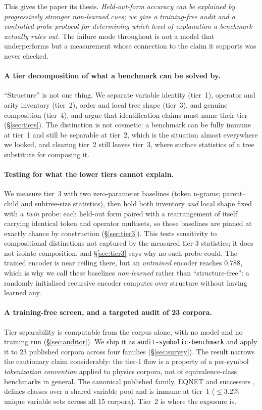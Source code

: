 This gives the paper its thesis. \emph{Held-out-form accuracy can be explained by progressively
stronger non-learned cues; we give a training-free audit and a controlled-probe protocol for
determining which level of explanation a benchmark actually rules out.} The failure mode throughout
is not a model that underperforms but a measurement whose connection to the claim it supports was
never checked.

\paragraph{A tier decomposition of what a benchmark can be solved by.} ``Structure'' is not one
thing. We separate variable identity (tier~1), operator and arity inventory (tier~2), order and
local tree shape (tier~3), and genuine composition (tier~4), and argue that identification claims
must name their tier (\S\ref{sec:tiers}). The distinction is not cosmetic: a benchmark can be fully
immune at tier~1 and still be separable at tier~2, which is the situation almost everywhere we
looked, and clearing tier~2 still leaves tier~3, where surface statistics of a tree substitute
for composing it.

\paragraph{Testing for what the lower tiers cannot explain.} We measure tier~3 with two
zero-parameter baselines (token n-grams; parent--child and subtree-size statistics), then hold both
inventory \emph{and} local shape fixed with a \emph{twin} probe: each held-out form paired with a
rearrangement of itself carrying identical token and operator multisets, so those baselines are
pinned at exactly chance by construction (\S\ref{sec:tier3}). This tests sensitivity to
compositional distinctions not captured by the measured tier-3 statistics; it does not isolate
composition, and \S\ref{sec:tier3} says why no such probe could. The trained encoder is near
ceiling there, but an \emph{untrained} encoder reaches $0.788$, which is why we call these
baselines \emph{non-learned} rather than ``structure-free'': a randomly initialised recursive
encoder computes over structure without having learned any.

\paragraph{A training-free screen, and a targeted audit of 23 corpora.} Tier separability is computable
from the corpus alone, with no model and no training run (\S\ref{sec:auditor}). We ship it as
\texttt{audit-symbolic-benchmark} and apply it to 23 published corpora across four families
(\S\ref{sec:survey}). The result narrows the cautionary claim considerably: the tier-1 flaw is a
property of a per-symbol \emph{tokenization convention} applied to physics corpora, not of
equivalence-class benchmarks in general. The canonical published family, EQNET
\citep{allamanis2017learning} and successors \citep{gangwar2023semantic, zheng2025egen},
defines classes over a shared variable pool and is immune at tier~1 ($\leq 3.2\%$ unique
variable sets across all 15 corpora). Tier~2 is where the exposure is.

